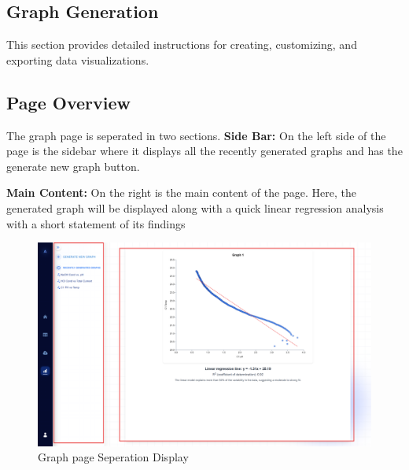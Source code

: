 \documentclass[12pt]{article}
\begin{document}

\subsection{Graph Generation}

This section provides detailed instructions for creating, customizing, and
exporting data visualizations.

\subsection*{Page Overview}
The graph page is seperated in two sections. 
\newline \newline
\textbf{Side Bar:} \newline
On the left side of the page is the sidebar where it displays all the recently
generated graphs and has the generate new graph button.
\newline\newline

\noindent \textbf{Main Content:}\newline
On the right is the main content of the page. Here, the generated graph will be
displayed along with a quick linear regression analysis with a short statement
of its findings 
\begin{figure}[H]
    \centering
    \includegraphics[scale=0.3]{./Diagrams/graph page .png}
    \caption{Graph page Seperation Display}
    \label{fig:example}
\end{figure}
\end{document}

